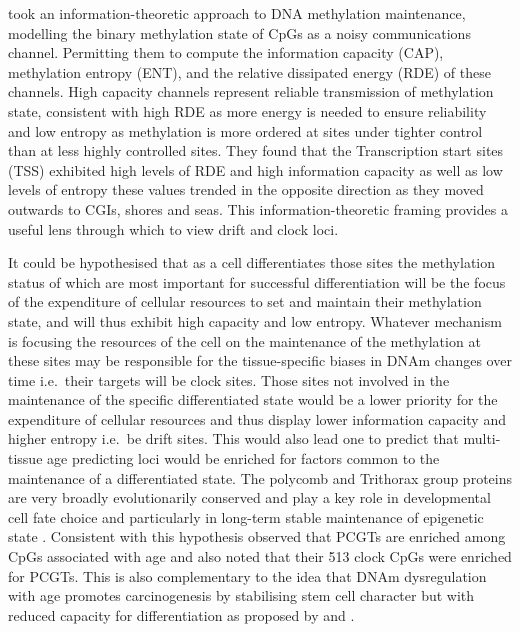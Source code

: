 \documentclass[]{book}
\begin{document}
\citet{Jenkinson2017} took an information-theoretic approach to DNA methylation maintenance, modelling the binary methylation state of CpGs as a noisy communications channel. Permitting them to compute the information capacity (CAP), methylation entropy (ENT), and the relative dissipated energy (RDE) of these channels. High capacity channels represent reliable transmission of methylation state, consistent with high RDE as more energy is needed to ensure reliability and low entropy as methylation is more ordered at sites under tighter control than at less highly controlled sites. They found that the Transcription start sites (TSS) exhibited high levels of RDE and high information capacity as well as low levels of entropy these values trended in the opposite direction as they moved outwards to CGIs, shores and seas. This information-theoretic framing provides a useful lens through which to view drift and clock loci.

It could be hypothesised that as a cell differentiates those sites the methylation status of which are most important for successful differentiation will be the focus of the expenditure of cellular resources to set and maintain their methylation state, and will thus exhibit high capacity and low entropy. Whatever mechanism is focusing the resources of the cell on the maintenance of the methylation at these sites may be responsible for the tissue-specific biases in DNAm changes over time i.e.~their targets will be clock sites. Those sites not involved in the maintenance of the specific differentiated state would be a lower priority for the expenditure of cellular resources and thus display lower information capacity and higher entropy i.e.~be drift sites. This would also lead one to predict that multi-tissue age predicting loci would be enriched for factors common to the maintenance of a differentiated state. The polycomb and Trithorax group proteins are very broadly evolutionarily conserved and play a key role in developmental cell fate choice and particularly in long-term stable maintenance of epigenetic state \citep{Schuettengruber2017}. Consistent with this hypothesis \citet{Teschendorff2010} observed that PCGTs are enriched among CpGs associated with age and \citet{Levine2018} also noted that their 513 clock CpGs were enriched for PCGTs. This is also complementary to the idea that DNAm dysregulation with age promotes carcinogenesis by stabilising stem cell character but with reduced capacity for differentiation as proposed by \citet{Teschendorff2010} and \citet{Rakyan2010}.
\end{document}

